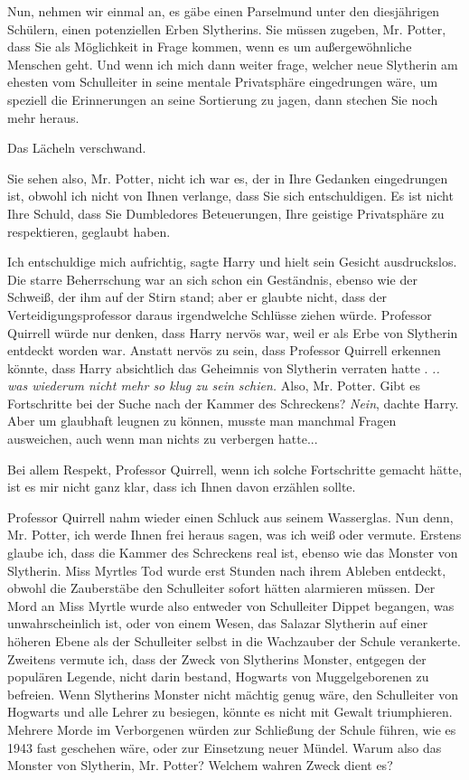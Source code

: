 \glqq{}Nun, nehmen wir einmal an, es gäbe einen Parselmund unter den diesjährigen
Schülern, einen potenziellen Erben Slytherins. Sie müssen zugeben, Mr. Potter,
dass Sie als Möglichkeit in Frage kommen, wenn es um außergewöhnliche Menschen
geht. Und wenn ich mich dann weiter frage, welcher neue Slytherin am ehesten vom
Schulleiter in seine mentale Privatsphäre eingedrungen wäre, um speziell die
Erinnerungen an seine Sortierung zu jagen, dann stechen Sie noch mehr heraus.\grqq{}

Das Lächeln verschwand.

\glqq{}Sie sehen also, Mr. Potter, nicht ich war es, der in Ihre Gedanken
eingedrungen ist, obwohl ich nicht von Ihnen verlange, dass Sie sich
entschuldigen. Es ist nicht Ihre Schuld, dass Sie Dumbledores Beteuerungen, Ihre
geistige Privatsphäre zu respektieren, geglaubt haben.\grqq{}

\glqq{}Ich entschuldige mich aufrichtig\grqq{}, sagte Harry und hielt sein
Gesicht ausdruckslos. Die starre Beherrschung war an sich schon ein Geständnis,
ebenso wie der Schweiß, der ihm auf der Stirn stand; aber er glaubte nicht, dass
der Verteidigungsprofessor daraus irgendwelche Schlüsse ziehen würde. Professor
Quirrell würde nur denken, dass Harry nervös war, weil er als Erbe von Slytherin
entdeckt worden war. Anstatt nervös zu sein, dass Professor Quirrell erkennen
könnte, dass Harry absichtlich das Geheimnis von Slytherin verraten hatte .
\emph{.. was wiederum nicht mehr so klug zu sein schien.} \glqq{}Also, Mr.
Potter. Gibt es Fortschritte bei der Suche nach der Kammer des Schreckens?\grqq{}
\emph{Nein}, dachte Harry. Aber um glaubhaft leugnen zu können, musste man
manchmal Fragen ausweichen, auch wenn man nichts zu verbergen hatte...

\glqq{}Bei allem Respekt, Professor Quirrell, wenn ich solche Fortschritte
gemacht hätte, ist es mir nicht ganz klar, dass ich Ihnen davon erzählen
sollte.\grqq{}

Professor Quirrell nahm wieder einen Schluck aus seinem Wasserglas. \glqq{}Nun
denn, Mr. Potter, ich werde Ihnen frei heraus sagen, was ich weiß oder vermute.
Erstens glaube ich, dass die Kammer des Schreckens real ist, ebenso wie das
Monster von Slytherin. Miss Myrtles Tod wurde erst Stunden nach ihrem Ableben
entdeckt, obwohl die Zauberstäbe den Schulleiter sofort hätten alarmieren
müssen. Der Mord an Miss Myrtle wurde also entweder von Schulleiter Dippet
begangen, was unwahrscheinlich ist, oder von einem Wesen, das Salazar Slytherin
auf einer höheren Ebene als der Schulleiter selbst in die Wachzauber der Schule
verankerte. Zweitens vermute ich, dass der Zweck von Slytherins Monster,
entgegen der populären Legende, nicht darin bestand, Hogwarts von
Muggelgeborenen zu befreien. Wenn Slytherins Monster nicht mächtig genug wäre,
den Schulleiter von Hogwarts und alle Lehrer zu besiegen, könnte es nicht mit
Gewalt triumphieren. Mehrere Morde im Verborgenen würden zur Schließung der
Schule führen, wie es 1943 fast geschehen wäre, oder zur Einsetzung neuer
Mündel. Warum also das Monster von Slytherin, Mr. Potter? Welchem wahren Zweck
dient es?\grqq{}

